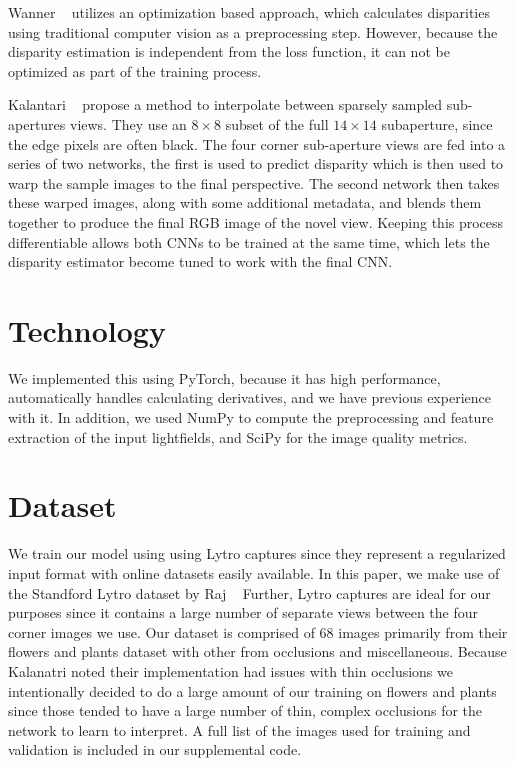\documentclass[10pt,twocolumn,letterpaper]{article}
\begin{document}
Wanner \etal~\cite{Wanner} utilizes an optimization based approach, which calculates disparities
using traditional computer vision as a preprocessing step. However, because the disparity estimation
is independent from the loss function, it can not be optimized as part of the training process. 

Kalantari \etal~\cite{LearningViewSynthesis} propose a method to interpolate between 
sparsely sampled sub-apertures views. They use an $8 \times 8$ subset of the full $14 \times 14$ subaperture, since the
edge pixels are often black. The four corner sub-aperture views are fed into a series of two 
networks, the first is used to predict disparity which is then used to warp the sample images to the final perspective.
The second network then takes these warped images, along with some additional metadata, and blends them together
to produce the final RGB image of the novel view. Keeping this process differentiable allows both CNNs to 
be trained at the same time, which lets the disparity estimator become tuned to work with the final CNN.

\section{Technology}

We implemented this using PyTorch, because it has high performance,
automatically handles calculating derivatives, and we have previous experience with it.
In addition, we used NumPy to compute the preprocessing and feature extraction of the input lightfields,
and SciPy for the image quality metrics.

\section{Dataset}

We train our model using using Lytro captures since they represent a regularized input format with
online datasets easily available. In this paper, we make use of the Standford Lytro dataset by Raj \etal~\cite{StanfordLytro}
Further, Lytro captures are ideal for our purposes since it contains a large number of separate views between the
four corner images we use. Our dataset is comprised of 68 images primarily from their flowers and plants dataset with
other from occlusions and miscellaneous. Because Kalanatri \etal noted their implementation had issues with thin occlusions
we intentionally decided to do a large amount of our training on flowers and plants since those tended to have a large number
of thin, complex occlusions for the network to learn to interpret. A full list of the images used for training and
validation is included in our supplemental code.
\end{document}
